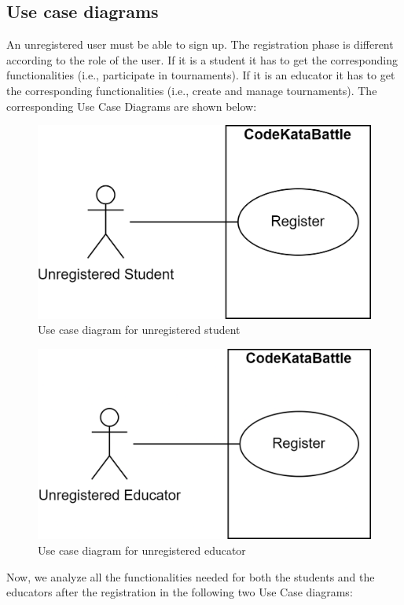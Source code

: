 \documentclass[12pt, a4paper]{report}
\begin{document}
    \subsection{Use case diagrams}
    An unregistered user must be able to sign up. 
    The registration phase is different according to the role of the user. 
    If it is a student it has to get the corresponding functionalities (i.e., participate in tournaments). 
    If it is an educator it has to get the corresponding functionalities (i.e., create and manage tournaments). 
    The corresponding Use Case Diagrams are shown below: 
    \begin{figure}[H]
        \centering
        \includegraphics[width=0.5\linewidth]{images/unregisteredstud.png}
        \caption{Use case diagram for unregistered student}
    \end{figure}
    \begin{figure}[H]
        \centering
        \includegraphics[width=0.5\linewidth]{images/unregistereded.png}
        \caption{Use case diagram for unregistered educator}
    \end{figure}
    Now, we analyze all the functionalities needed for both the students and the educators after the registration in the following two Use Case diagrams: 
\end{document}
